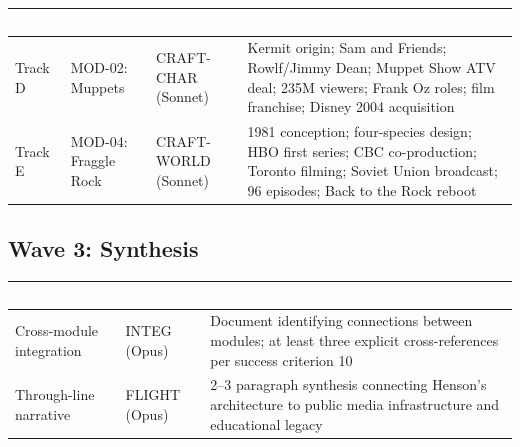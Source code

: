 \documentclass[11pt,letterpaper]{article}
\newcommand{\tableheader}[1]{\textbf{\sffamily\textcolor{white}{#1}}}
\begin{document}
\begin{center}
\begin{tabularx}{\textwidth}{L{1.5cm}L{2.5cm}L{2.5cm}X}
\toprule
{}
\tableheader{Track} & \tableheader{Module} & \tableheader{Agent} & \tableheader{Key Research Tasks} \\
\midrule
Track D & MOD-02: Muppets & CRAFT-CHAR (Sonnet) & Kermit origin; Sam and Friends; Rowlf/Jimmy Dean; Muppet Show ATV deal; 235M viewers; Frank Oz roles; film franchise; Disney 2004 acquisition \\
Track E & MOD-04: Fraggle Rock & CRAFT-WORLD (Sonnet) & 1981 conception; four-species design; HBO first series; CBC co-production; Toronto filming; Soviet Union broadcast; 96 episodes; Back to the Rock reboot \\
\bottomrule
\end{tabularx}
\end{center}

\subsection{Wave 3: Synthesis}

\begin{center}
\begin{tabularx}{\textwidth}{L{3cm}L{2.5cm}X}
\toprule
{}
\tableheader{Task} & \tableheader{Agent} & \tableheader{Deliverable} \\
\midrule
Cross-module integration & INTEG (Opus) & Document identifying connections between modules; at least three explicit cross-references per success criterion 10 \\
Through-line narrative & FLIGHT (Opus) & 2--3 paragraph synthesis connecting Henson's architecture to public media infrastructure and educational legacy \\
\bottomrule
\end{tabularx}
\end{center}
\end{document}
